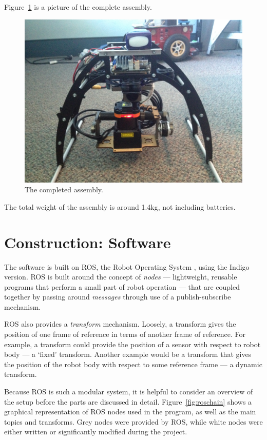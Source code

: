 \documentclass[12pt,oneside,a4paper]{book}
\begin{document}
Figure~\ref{fig:mk2} is a picture of the complete assembly.

\begin{figure}[h!]
  \centering
  \includegraphics[width=\textwidth]{figs/mk2}
  \caption{The completed assembly.}
  \label{fig:mk2}
\end{figure}

The total weight of the assembly is around 1.4kg, not including batteries.

\chapter{Construction: Software}
\label{sec:software}

The software is built on ROS, the Robot Operating System
\cite{rosos}, using the Indigo version. ROS is built around the
concept of \emph{nodes} --- lightweight, reusable programs that perform a small
part of robot operation --- that are coupled together by passing
around \emph{messages} through use of a publish-subscribe mechanism.

ROS also provides a \emph{transform} mechanism. Loosely, a transform
gives the position of one frame of reference in terms of another frame
of reference. For example, a transform could provide the position of a
sensor with respect to robot body --- a `fixed' transform. Another
example would be a transform that gives the position of the robot body with
respect to some reference frame --- a dynamic transform.

Because ROS is such a modular system, it is helpful to consider an
overview of the setup before the parts are discussed in
detail. Figure~\ref{fig:roschain} shows a graphical representation of
ROS nodes used in the program, as well as the main topics and
transforms. Grey nodes were provided by ROS, while white nodes were
either written or significantly modified during the project.
\end{document}
